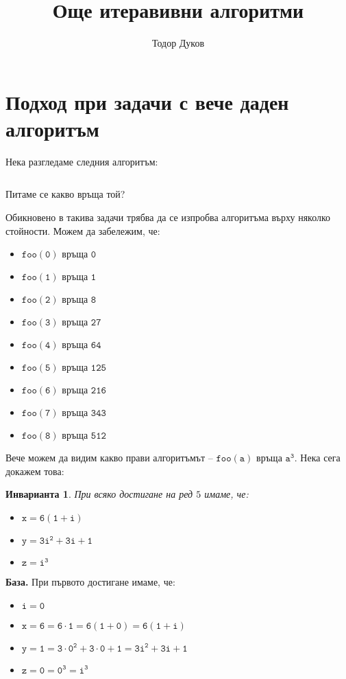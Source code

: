 \documentclass{article}
\title{Още итеравивни алгоритми}
\author{Тодор Дуков}
\date{}
\theoremstyle{definition}
\theoremstyle{plain}
\newtheorem*{invariant}{Инварианта}
\theoremstyle{remark}
\theoremstyle{definition}
\begin{document}
\maketitle

\section*{Подход при задачи с вече даден алгоритъм}

Нека разгледаме следния алгоритъм:
\inputminted[linenos]{c++}{algorithms/foo.cpp}
Питаме се какво връща той?

Обикновено в такива задачи трябва да се изпробва алгоритъма върху няколко стойности.
Можем да забележим, че:
\begin{itemize}
    \item $\mathtt{foo(0) \text{ връща } 0}$
    \item $\mathtt{foo(1) \text{ връща } 1}$
    \item $\mathtt{foo(2) \text{ връща } 8}$
    \item $\mathtt{foo(3) \text{ връща } 27}$
    \item $\mathtt{foo(4) \text{ връща } 64}$
    \item $\mathtt{foo(5) \text{ връща } 125}$
    \item $\mathtt{foo(6) \text{ връща } 216}$
    \item $\mathtt{foo(7) \text{ връща } 343}$
    \item $\mathtt{foo(8) \text{ връща } 512}$
\end{itemize}

Вече можем да видим какво прави алгоритъмът -- $\mathtt{foo(a) \text{ връща } a^3}$.
Нека сега докажем това:
\begin{invariant}
    При всяко достигане на ред $5$ имаме, че:
    \begin{itemize}
        \item $\mathtt{x = 6 (1 + i)}$
        \item $\mathtt{y = 3i^2 + 3i + 1}$
        \item $\mathtt{z = i^3}$
    \end{itemize}
\end{invariant}

\textbf{База.}
При първото достигане имаме, че:
\begin{itemize}
    \item $\mathtt{i = 0}$
    \item $\mathtt{x = 6 = 6 \cdot 1 = 6 (1 + 0) = 6 (1 + i)}$
    \item $\mathtt{y = 1 = 3 \cdot 0^2 + 3 \cdot 0 + 1 = 3i^2 + 3i + 1}$
    \item $\mathtt{z = 0 = 0^3 = i^3}$
\end{itemize}
\end{document}

